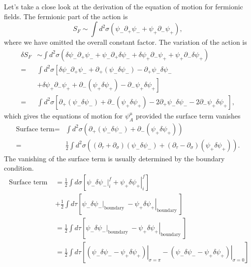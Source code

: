 \documentclass[graybox,envcountchap,sectrefs]{svmono}
\begin{document}
Let's take a close look at the derivation of the equation of motion for fermionic fields.
The fermionic part of the action is 
\begin{equation}\label{eq:faction}
S_F\sim \int d^2\sigma (\psi_{-}\partial_{+}\psi_{-}+\psi_{+}\partial_{-}\psi_{+}),
\end{equation}
where we have omitted the overall constant factor.
The variation of the action is
\begin{equation}
\begin{aligned}
\delta S_{F} & \sim \int d^{2} \sigma\left(\delta \psi_{-} \partial_{+} \psi_{-}+\psi_{-} \partial_{+} \delta \psi_{-}+\delta \psi_{+} \partial_{-} \psi_{+}+\psi_{+} \partial_{-} \delta \psi_{+}\right) \\
=&\int d^{2} \sigma\left[\delta \psi_{-} \partial_{+} \psi_{-}+\partial_{+}\left(\psi_{-} \delta \psi_{-}\right)-\partial_{+} \psi_{-} \delta \psi_{-}\right.\\
&\left.+\delta \psi_{+} \partial_{-} \psi_{+}+\partial_{-}\left(\psi_{+} \delta \psi_{+}\right)-\partial_{-} \psi_{+} \delta \psi_{+}\right] \\
=&\int d^{2} \sigma\left[
\partial_{+}\left(\psi_{-} \delta \psi_{-}\right)
+\partial_{-}\left(\psi_{+} \delta \psi_{+}\right)
-2 \partial_{+} \psi_{-} \delta \psi_{-}
-2 \partial_{-} \psi_{+} \delta \psi_{+}\right],
\end{aligned}
\end{equation}
which gives the equations of motion for $\psi^{\mu}_A$ provided the surface term vanishes
\begin{align}
\text{Surface term}=&\int d^{2} \sigma 
\left( \partial_{+}\left(\psi_{-} \delta \psi_{-}\right)
+\partial_{-}\left(\psi_{+} \delta \psi_{+}\right)\right)\nonumber\\
=&\frac{1}{2}
\int d^{2} \sigma \left(
\left(\partial_{\tau}+\partial_{\sigma} \right)\left(\psi_{-} \delta \psi_{-}\right)
+\left( \partial_{\tau}-\partial_{\sigma}\right)\left(\psi_{+} \delta \psi_{+}\right) \right).
\end{align}
The vanishing of the surface term is usually determined by the boundary condition.
\begin{equation}\label{eq:surfaceterm}
\begin{aligned}
\text { Surface term } &=\frac{1}{2} \int d \sigma\left[\psi_{-}\delta \psi_{-}\left.\right|_{i} ^{f}+\left.\psi_{+} \delta \psi_{+}\right|_{i} ^{f}\right] \\
&+\frac{1}{2} \int d \tau\left[\psi_{-} \delta \psi_-\left.\right|_{\text {boundary }}-\left.\psi_{+} \delta \psi_{+}\right|_{\text {boundary }}\right] \\
&=\frac{1}{2} \int d \tau\left[\psi_{-} \delta \psi_-\left.\right|_{\text {boundary }}-\left.\psi_{+} \delta \psi_{+}\right|_{\text {boundary }}\right] \\
&=\frac{1}{2} \int d \tau\left[\left.\left(\psi_{-} \delta \psi_{-}-\psi_{+} \delta \psi_{+}\right)\right|_{\sigma=\pi}-\left.\left(\psi_{-} \delta \psi_{-}-\psi_{+} \delta \psi_{+}\right)\right|_{\sigma=0}\right]
\end{aligned}
\end{equation}
\end{document}
